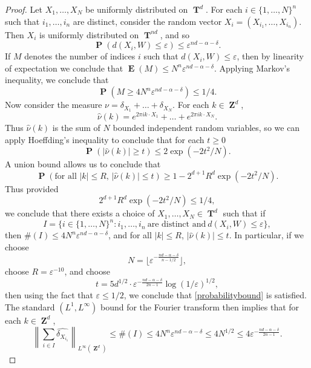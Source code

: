 \documentclass[12pt,reqno]{article}
\DeclareMathOperator{\ZZ}{\mathbf{Z}}
\DeclareMathOperator{\TT}{\mathbf{T}}
\DeclareMathOperator{\EE}{\mathbf{E}}
\DeclareMathOperator{\PP}{\mathbf{P}}
\begin{document}
\begin{proof}
    Let $X_1, \dots, X_N$ be uniformly distributed on $\TT^d$. For each $i \in \{ 1, \dots, N \}^n$ such that $i_1, \dots, i_n$ are distinct, consider the random vector $X_i = (X_{i_1}, \dots, X_{i_n})$. Then $X_i$ is uniformly distributed on $\TT^{nd}$, and so
    \[ \PP(d(X_i,W) \leq \varepsilon) \leq \varepsilon^{nd - \alpha - \delta}. \]
    If $M$ denotes the number of indices $i$ such that $d(X_i,W) \leq \varepsilon$, then by linearity of expectation we conclude that $\EE(M) \leq N^n \varepsilon^{nd - \alpha - \delta}$. Applying Markov's inequality, we conclude that
    \[ \PP(M \geq 4 N^n \varepsilon^{nd - \alpha - \delta}) \leq 1/4. \]
    Now consider the measure $\nu = \delta_{X_1} + \dots + \delta_{X_N}$. For each $k \in \ZZ^d$,
    \[ \widehat{\nu}(k) = e^{2 \pi i k \cdot X_1} + \dots + e^{2 \pi i k \cdot X_N}. \] 
    Thus $\widehat{\nu}(k)$ is the sum of $N$ bounded independent random variables, so we can apply Hoeffding's inequality to conclude that for each $t \geq 0$
    \[ \PP(|\widehat{\nu}(k)| \geq t) \leq 2 \exp ( - 2 t^2 / N). \]
    A union bound allows us to conclude that
    \[ \PP \left( \text{for all $|k| \leq R$, $|\widehat{\nu}(k)| \leq t$} \right) \geq 1 - 2^{d+1} R^d \exp ( - 2 t^2 / N). \]
    Thus provided
    \begin{equation} \label{probabilitybound}
        2^{d+1} R^d \exp(-2t^2/N) \leq 1/4,
    \end{equation}
    we conclude that there exists a choice of $X_1, \dots, X_N \in \TT^d$ such that if
    \[ I = \{ i \in \{ 1, \dots, N \}^n : i_1, \dots, i_n\ \text{are distinct and}\ d(X_i,W) \leq \varepsilon \}, \]
    then $\#(I) \leq 4 N^n \varepsilon^{nd - \alpha - \delta}$, and for all $|k| \leq R$, $|\widehat{\nu}(k)| \leq t$. In particular, if we choose
    \[ N = \lfloor \varepsilon^{-\frac{nd - \alpha - \delta}{n - 1/2}} \rfloor, \]
    choose $R = \varepsilon^{-10}$, and choose
    \[ t = 5d^{1/2} \cdot \varepsilon^{- \frac{nd - \alpha - \delta}{2n - 1}} \log(1/\varepsilon)^{1/2}, \]
    then using the fact that $\varepsilon \leq 1/2$, we conclude that \eqref{probabilitybound} is satisfied. The standard $(L^1,L^\infty)$ bound for the Fourier transform then implies that for each $k \in \ZZ^d$,
    \[ \left\| \sum_{i \in I} \widehat{\delta_{X_{i_1}}} \right\|_{L^\infty(\ZZ^d)} \leq \#(I) \leq 4 N^n \varepsilon^{nd - \alpha - \delta} \leq 4 N^{1/2} \leq 4 \varepsilon^{- \frac{nd - \alpha - \delta}{2n - 1}}. \]

\end{proof}
\end{document}
